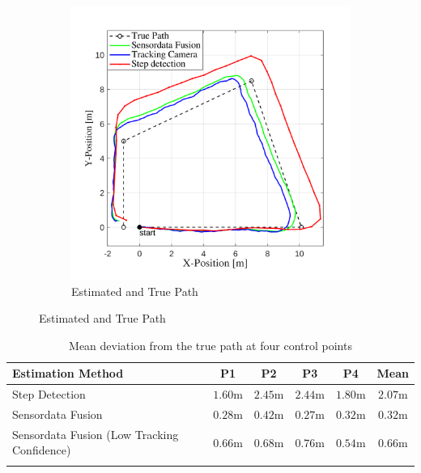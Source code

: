 \documentclass[engproc,conferenceproceedings,submit,pdftex,moreauthors]{Definitions/mdpi}
\begin{document}
\begin{figure}
\begin{subfigure}[b]{0.49\textwidth}
		\includegraphics[width=1.1\textwidth]{Path2.png}
		\caption{Estimated and True Path}
		\label{fig:path2}
	\end{subfigure}
\end{figure}


\begin{table}[H] 
\caption{Mean deviation from the true path at four control points\label{tab1}}
\begin{tabularx}{\textwidth}{lccccc}
\toprule
\textbf{Estimation Method}	& \textbf{P1}	& \textbf{P2} & \textbf{P3} & \textbf{P4} & \textbf{Mean}\\
\midrule
Step Detection	&    $1.60\mathrm{m}$ &   $2.45\mathrm{m}$ &   $2.44\mathrm{m}$  &  $1.80\mathrm{m}$ & $2.07\mathrm{m}$ \\
Sensordata Fusion  &  $0.28\mathrm{m}$  &  $0.42\mathrm{m}$  &  $0.27\mathrm{m}$ &   $0.32\mathrm{m}$ & $0.32\mathrm{m}$ \\
Sensordata Fusion (Low Tracking Confidence) &    $0.66\mathrm{m}$ &   $0.68\mathrm{m}$  &  $0.76\mathrm{m}$  &  $0.54\mathrm{m}$ & $0.66\mathrm{m}$\\
\bottomrule\\
\end{tabularx}



\end{table}
\end{document}
